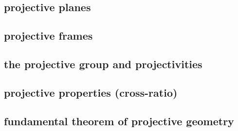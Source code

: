\subsection{projective planes}
\subsection{projective frames}
\subsection{the projective group and projectivities}
\subsection{projective properties (cross-ratio)}
\subsection{fundamental theorem of projective geometry}


